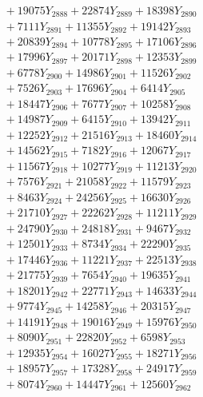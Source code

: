 \documentclass[a4paper,10pt]{article}
\begin{document}
{\begin{align}
&\;  + 19075 Y_{2888} + 22874 Y_{2889} + 18398 Y_{2890} \\[0.3ex]
&\;  + 7111 Y_{2891} + 11355 Y_{2892} + 19142 Y_{2893} \\[0.3ex]
&\;  + 20839 Y_{2894} + 10778 Y_{2895} + 17106 Y_{2896} \\[0.3ex]
&\;  + 17996 Y_{2897} + 20171 Y_{2898} + 12353 Y_{2899} \\[0.3ex]
&\;  + 6778 Y_{2900} + 14986 Y_{2901} + 11526 Y_{2902} \\[0.3ex]
&\;  + 7526 Y_{2903} + 17696 Y_{2904} + 6414 Y_{2905} \\[0.3ex]
&\;  + 18447 Y_{2906} + 7677 Y_{2907} + 10258 Y_{2908} \\[0.5ex]\allowbreak
&\;  + 14987 Y_{2909} + 6415 Y_{2910} + 13942 Y_{2911} \\[0.3ex]
&\;  + 12252 Y_{2912} + 21516 Y_{2913} + 18460 Y_{2914} \\[0.3ex]
&\;  + 14562 Y_{2915} + 7182 Y_{2916} + 12067 Y_{2917} \\[0.3ex]
&\;  + 11567 Y_{2918} + 10277 Y_{2919} + 11213 Y_{2920} \\[0.3ex]
&\;  + 7576 Y_{2921} + 21058 Y_{2922} + 11579 Y_{2923} \\[0.3ex]
&\;  + 8463 Y_{2924} + 24256 Y_{2925} + 16630 Y_{2926} \\[0.3ex]
&\;  + 21710 Y_{2927} + 22262 Y_{2928} + 11211 Y_{2929} \\[0.3ex]
&\;  + 24790 Y_{2930} + 24818 Y_{2931} + 9467 Y_{2932} \\[0.3ex]
&\;  + 12501 Y_{2933} + 8734 Y_{2934} + 22290 Y_{2935} \\[0.3ex]
&\;  + 17446 Y_{2936} + 11221 Y_{2937} + 22513 Y_{2938} \\[0.5ex]\allowbreak
&\;  + 21775 Y_{2939} + 7654 Y_{2940} + 19635 Y_{2941} \\[0.3ex]
&\;  + 18201 Y_{2942} + 22771 Y_{2943} + 14633 Y_{2944} \\[0.3ex]
&\;  + 9774 Y_{2945} + 14258 Y_{2946} + 20315 Y_{2947} \\[0.3ex]
&\;  + 14191 Y_{2948} + 19016 Y_{2949} + 15976 Y_{2950} \\[0.3ex]
&\;  + 8090 Y_{2951} + 22820 Y_{2952} + 6598 Y_{2953} \\[0.3ex]
&\;  + 12935 Y_{2954} + 16027 Y_{2955} + 18271 Y_{2956} \\[0.3ex]
&\;  + 18957 Y_{2957} + 17328 Y_{2958} + 24917 Y_{2959} \\[0.3ex]
&\;  + 8074 Y_{2960} + 14447 Y_{2961} + 12560 Y_{2962} \\[0.3ex]

\end{align}}
\end{document}
